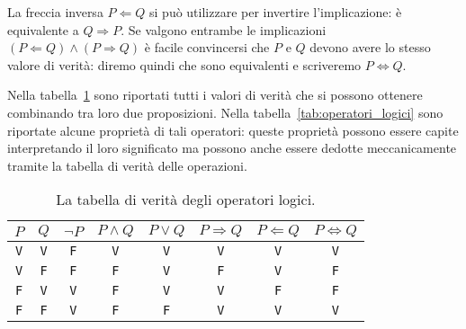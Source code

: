 La freccia inversa $P\Leftarrow Q$ si può utilizzare per
invertire l'implicazione: è equivalente a $Q \Rightarrow P$.
Se valgono entrambe le implicazioni
$(P \Leftarrow Q) \land (P\Rightarrow Q)$
è facile convincersi che $P$ e $Q$ devono avere lo stesso
valore di verità: diremo quindi che sono equivalenti e
scriveremo $P \Leftrightarrow Q$.

Nella tabella~\ref{tab:verita_operatori_logici} sono riportati
tutti i valori di verità che si possono ottenere combinando
tra loro due proposizioni. Nella tabella~\ref{tab:operatori_logici}
sono riportate alcune proprietà di tali operatori: queste
proprietà possono essere capite interpretando il loro significato
ma possono anche essere dedotte meccanicamente tramite la tabella
di verità delle operazioni.

\begin{table}
\begin{center}
  \begin{tabular}{cc|cccccc}
    $P$ & $Q$ & $\neg P$ & $P\land Q$ & $P\lor Q$ & $P\Rightarrow Q$ &
    $P\Leftarrow Q$ & $P\Leftrightarrow Q$ \\\hline
    \texttt{V} & \texttt{V} & \texttt{F} & \texttt{V} & \texttt{V} & \texttt{V} & \texttt{V} & \texttt{V} \\
    \texttt{V} & \texttt{F} & \texttt{F} & \texttt{F} & \texttt{V} & \texttt{F} & \texttt{V} & \texttt{F} \\
    \texttt{F} & \texttt{V} & \texttt{V} & \texttt{F} & \texttt{V} & \texttt{V} & \texttt{F} & \texttt{F} \\
    \texttt{F} & \texttt{F} & \texttt{V} & \texttt{F} & \texttt{F} & \texttt{V} & \texttt{V} & \texttt{V} \\
    \end{tabular}
\end{center}
\caption{La tabella di verità degli operatori logici.}
\label{tab:verita_operatori_logici}
\end{table}

